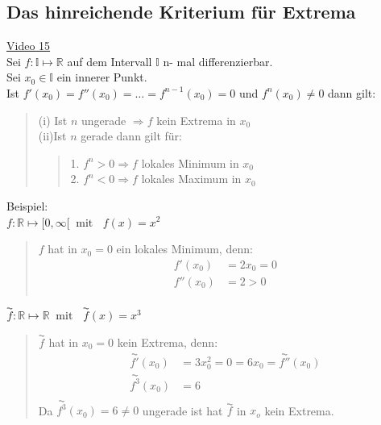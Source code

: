 \subsection{Das hinreichende Kriterium für Extrema}
\href{https://youtu.be/qZN36TCHIVw}{Video 15}\\
Sei $ f:  \mathbb{I}\longmapsto \mathbb{R} $ auf dem Intervall $  \mathbb{I} $ n- mal differenzierbar.\\
Sei $ x_0\in  \mathbb{I} $ ein innerer Punkt.\\
Ist $ f'(x_0)=f''(x_0) =\ldots =f^{n-1}(x_0)=0$ und $ f^{n}(x_0)\neq 0 $ dann gilt:\\
\begin{quote}
(i)\;\; Ist $ n $ ungerade $ \Rightarrow  f$ kein Extrema in $ x_0 $\\
(ii)\;\;Ist $ n $ gerade dann gilt für:
\begin{quote}
1. $f^n > 0 \Rightarrow f$ lokales Minimum in $ x_0 $\\
2. $f^n < 0 \Rightarrow f$ lokales Maximum in $ x_0 $\\
\end{quote}
\end{quote}
Beispiel:\\
\textbullet \;\;$ f:\mathbb{R}\longmapsto[0,\infty[\;\;\text{mit }\;\; f(x)=x^2 $\\
\begin{quote}
$ f $ hat in $ x_0=0 $ ein lokales Minimum, denn:\\
\begin{align*}
f'(x_0)&=2x_0=0\\
f''(x_0)&=2>0\\
\end{align*}
\end{quote}
\newpage
\noindent
\textbullet\;\;$\overset{\AC}{f}: \mathbb{R}\longmapsto\mathbb{R}\;\;\text{mit }\;\;\overset{\AC}{f}(x)=x^3$\\
\begin{quote}
$\overset{\AC}{f}$ hat in $ x_0=0 $ kein Extrema, denn:\\
\begin{align*}
\overset{\AC}{f'}(x_0)&=3x_0^2=0=6x_0=\overset{\AC}{f''}(x_0)\\
\overset{\AC}{f^{3}}(x_0)&=6\\
\end{align*}
Da $ \overset{\AC}{f^{3}}(x_0)=6\neq 0 $ ungerade ist hat $\overset{\AC}{f}  $ in $ x_o $ kein Extrema.\\
\end{quote}
